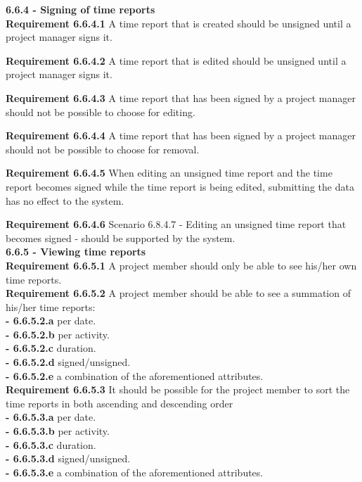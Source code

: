 \documentclass{article}
\begin{document}
{\fontsize{11}{11}\selectfont \noindent\textbf{6.6.4 - Signing of time reports}} \\
\noindent
\textbf{Requirement 6.6.4.1} A time report that is created should be unsigned until a project manager signs it. \\
\addtocounter{timeRef}{1}
\textbf{Requirement 6.6.4.2} A time report that is edited should be unsigned until a project manager signs it. \\
\addtocounter{timeRef}{1}
\textbf{Requirement 6.6.4.3} A time report that has been signed by a project manager should not be possible to choose for editing. \\
\addtocounter{timeRef}{1}
\textbf{Requirement 6.6.4.4} A time report that has been signed by a project manager should not be possible to choose for removal. \\
\addtocounter{timeRef}{1}
\textbf{Requirement 6.6.4.5} When editing an unsigned time report and the time report becomes signed while the time report is being edited, submitting the data has no effect to the system. \\
\addtocounter{timeRef}{1}
\textbf{Requirement 6.6.4.6} Scenario 6.8.4.7 - Editing an unsigned time report that becomes signed - should be supported by the system. \\

{\fontsize{11}{11}\selectfont \noindent\textbf{6.6.5 - Viewing time reports}} \\
\noindent
\textbf{Requirement 6.6.5.1} A project member should only be able to see his/her own time reports. \\
\textbf{Requirement 6.6.5.2} A project member should be able to see a summation of his/her time reports:  \\
\indent
\textbf{- 6.6.5.2.a} per date.\\
\indent
\textbf{- 6.6.5.2.b} per activity.\\
\indent
\textbf{- 6.6.5.2.c} duration.\\
\indent
\textbf{- 6.6.5.2.d} signed/unsigned.\\
\indent
\textbf{- 6.6.5.2.e} a combination of the aforementioned attributes.\\
\textbf{Requirement 6.6.5.3} It should be possible for the project member to sort the time reports in both ascending and descending order \\
\indent 
\textbf{- 6.6.5.3.a} per date.\\
\indent
\textbf{- 6.6.5.3.b} per activity.\\
\indent
\textbf{- 6.6.5.3.c} duration.\\
\indent
\textbf{- 6.6.5.3.d} signed/unsigned.\\
\indent
\textbf{- 6.6.5.3.e} a combination of the aforementioned attributes.\\
\end{document}
